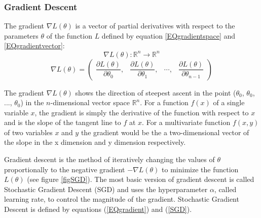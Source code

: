 \documentclass[a4paper,11pt,twoside]{article}
\newcommand*{\pd}[2]{\ensuremath{\dfrac{\partial #1}{\partial #2}}}
\begin{document}
\subsubsection{Gradient Descent}
The gradient $\nabla L(\theta)$ is a vector of partial derivatives with respect to the parameters $\theta$ of the function $L$ defined by equation \eqref{EQgradientspace} and \eqref{EQgradientvector}: \cite{gradient} \cite{convmath} 
\begin{equation}\label{EQgradientspace}
\nabla L(\theta) : \mathbb{R}^n \to \mathbb{R}^n
\end{equation}
\begin{equation}\label{EQgradientvector}
\nabla L(\theta) = 
	\begin{pmatrix} 
		\pd{L(\theta)}{\theta_{0}}, & 
		\pd{L(\theta)}{\theta_{1}}, &
		\cdots, &
		\pd{L(\theta)}{\theta_{n-1}}
		
		\end{pmatrix}
\end{equation}

The gradient $\nabla L(\theta)$ shows the direction of steepest ascent in the point ($\theta_{0}$, $\theta_{0}$, ..., $\theta_{0}$) in the $n$-dimensional vector space $\mathbb{R}^{n}$. For a function $f(x)$ of a single variable $x$, the gradient is simply the derivative of the function with respect to $x$ and is the slope of the tangent line to $f$ at $x$. For a multivariate function $f(x,y)$ of two variables $x$ and $y$ the gradient would be the a two-dimensional vector of the slope in the x dimension and y dimension respectively. 

Gradient descent is the method of iteratively changing the values of $\theta$ proportionally to the negative gradient $-\nabla L(\theta)$ to minimize the function $L(\theta)$ (see figure \ref{figSGD}). The most basic version of gradient descent is called Stochastic Gradient Descent (SGD) and uses the hyperparameter $\alpha$, called learning rate, to control the magnitude of the gradient. Stochastic Gradient Descent is defined by equations (\ref{EQgradient}) and (\ref{SGD}).
\end{document}
